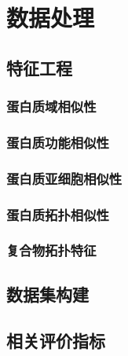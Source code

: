 \chapter{数据处理}
\label{chapter:dataprocess}

\section{特征工程}
\label{section:featEngineer}
\subsection{蛋白质域相似性}
\label{section:TopoSimilarity}
\subsection{蛋白质功能相似性}
\label{section:GoSimilarity}
\subsection{蛋白质亚细胞相似性}
\label{section:SubcellSimilarity}
\subsection{蛋白质拓扑相似性}
\label{section:TopSimilarity}
\subsection{复合物拓扑特征}
\label{section:ComplexTopoFeat}

\section{数据集构建}
\label{section:datasetsConstruct}

\section{相关评价指标}
\label{section:metrix}